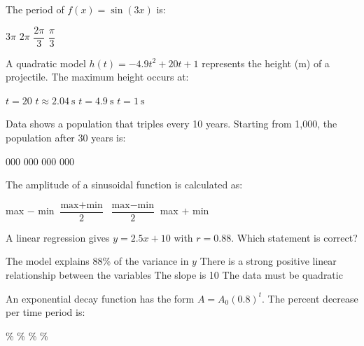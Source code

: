 \documentclass[addpoints]{exam}
\begin{document}
\begin{questions}
\question[1]
The period of $f(x) = \sin(3x)$ is:
\begin{choices}
    \choice $3\pi$
    \choice $2\pi$
    \correctchoice $\dfrac{2\pi}{3}$
    \choice $\dfrac{\pi}{3}$
\end{choices}
\vspace{3mm}

\question[1]
A quadratic model $h(t) = -4.9t^2 + 20t + 1$ represents the height (m) of a projectile. The maximum height occurs at:
\begin{choices}
    \choice $t = 20$
    \correctchoice $t \approx 2.04\ \text{s}$
    \choice $t = 4.9\ \text{s}$
    \choice $t = 1\ \text{s}$
\end{choices}
\vspace{3mm}

\question[1]
Data shows a population that triples every 10 years. Starting from 1{,}000, the population after 30 years is:
\begin{choices}
    000
    000
    000
    000
\end{choices}
\vspace{3mm}

\question[1]
The amplitude of a sinusoidal function is calculated as:
\begin{choices}
    \choice max $-$ min
    \choice $\dfrac{\text{max} + \text{min}}{2}$
    \correctchoice $\dfrac{\text{max} - \text{min}}{2}$
    \choice max $+$ min
\end{choices}
\vspace{3mm}

\question[1]
A linear regression gives $y = 2.5x + 10$ with $r = 0.88$. Which statement is correct?
\begin{choices}
    \choice The model explains 88\% of the variance in $y$
    \correctchoice There is a strong positive linear relationship between the variables
    \choice The slope is 10
    \choice The data must be quadratic
\end{choices}
\vspace{3mm}

\question[1]
An exponential decay function has the form $A = A_0(0.8)^t$. The percent decrease per time period is:
\begin{choices}
    \%
    \%
    \%
    \%
\end{choices}
\vspace{3mm}


\end{questions}
\end{document}
